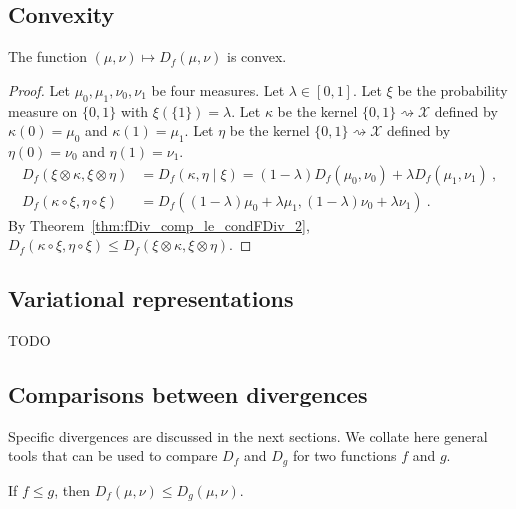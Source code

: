 \subsection{Convexity}

\begin{theorem}
  \label{thm:fDiv_convex}
  The function $(\mu, \nu) \mapsto D_f(\mu, \nu)$ is convex.
\end{theorem}

\begin{proof}
Let $\mu_0, \mu_1, \nu_0, \nu_1$ be four measures. Let $\lambda \in [0,1]$. Let $\xi$ be the probability measure on $\{0,1\}$ with $\xi(\{1\}) = \lambda$.
Let $\kappa$ be the kernel $\{0,1\} \rightsquigarrow \mathcal X$ defined by $\kappa(0) = \mu_0$ and $\kappa(1) = \mu_1$.
Let $\eta$ be the kernel $\{0,1\} \rightsquigarrow \mathcal X$ defined by $\eta(0) = \nu_0$ and $\eta(1) = \nu_1$.
\begin{align*}
D_f(\xi \otimes \kappa, \xi \otimes \eta)
&= D_f(\kappa, \eta \mid \xi)
= (1 - \lambda) D_f(\mu_0, \nu_0) + \lambda D_f(\mu_1, \nu_1)
\: , \\
D_f(\kappa \circ \xi, \eta \circ \xi)
&= D_f((1 - \lambda)\mu_0 + \lambda \mu_1, (1 - \lambda)\nu_0 + \lambda \nu_1)
\: .
\end{align*}
By Theorem~\ref{thm:fDiv_comp_le_condFDiv_2}, $D_f(\kappa \circ \xi, \eta \circ \xi) \le D_f(\xi \otimes \kappa, \xi \otimes \eta)$.
\end{proof}




\subsection{Variational representations}

TODO




\subsection{Comparisons between divergences}

Specific divergences are discussed in the next sections. We collate here general tools that can be used to compare $D_f$ and $D_g$ for two functions $f$ and $g$.

\begin{lemma}
  \label{lem:fDiv_mono_fun}
  If $f \le g$, then $D_f(\mu, \nu) \le D_g(\mu, \nu)$.
\end{lemma}

